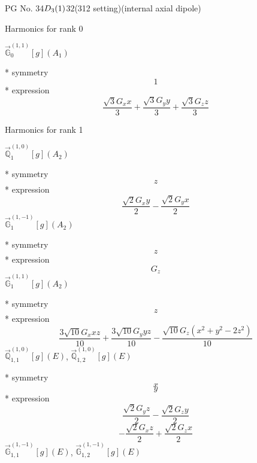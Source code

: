 \documentclass[fleqn,8pt]{jsarticle}
\begin{document}
\setcounter{MaxMatrixCols}{32}

\renewcommand{\tablename}{Table~}
\renewcommand{\figurename}{Figure~}
\begin{center}
\LARGE
PG No. 34\quad$D_{\rm 3}(1)$\quad$32$\quad(312 setting)\quad[ trigonal ] (internal axial dipole)
\end{center}

\noindent * Harmonics for rank 0

\noindent\quad $\vec{\mathbb{G}}_{0}^{(1,1)}[g](A_{1})$

\noindent\quad ** symmetry
\begin{dmath*}
1
\end{dmath*}
\noindent\quad ** expression
\begin{dmath*}
\frac{\sqrt{3} G_{x} x}{3} + \frac{\sqrt{3} G_{y} y}{3} + \frac{\sqrt{3} G_{z} z}{3}
\end{dmath*}

\noindent * Harmonics for rank 1

\noindent\quad $\vec{\mathbb{Q}}_{1}^{(1,0)}[g](A_{2})$

\noindent\quad ** symmetry
\begin{dmath*}
z
\end{dmath*}
\noindent\quad ** expression
\begin{dmath*}
\frac{\sqrt{2} G_{x} y}{2} - \frac{\sqrt{2} G_{y} x}{2}
\end{dmath*}
\noindent\quad $\vec{\mathbb{G}}_{1}^{(1,-1)}[g](A_{2})$

\noindent\quad ** symmetry
\begin{dmath*}
z
\end{dmath*}
\noindent\quad ** expression
\begin{dmath*}
G_{z}
\end{dmath*}
\noindent\quad $\vec{\mathbb{G}}_{1}^{(1,1)}[g](A_{2})$

\noindent\quad ** symmetry
\begin{dmath*}
z
\end{dmath*}
\noindent\quad ** expression
\begin{dmath*}
\frac{3 \sqrt{10} G_{x} x z}{10} + \frac{3 \sqrt{10} G_{y} y z}{10} - \frac{\sqrt{10} G_{z} \left(x^{2} + y^{2} - 2 z^{2}\right)}{10}
\end{dmath*}
\noindent\quad $\vec{\mathbb{Q}}_{1,1}^{(1,0)}[g](E)$, $\vec{\mathbb{Q}}_{1,2}^{(1,0)}[g](E)$

\noindent\quad ** symmetry
\begin{dmath*}
x
\end{dmath*}
\begin{dmath*}
y
\end{dmath*}
\noindent\quad ** expression
\begin{dmath*}
\frac{\sqrt{2} G_{y} z}{2} - \frac{\sqrt{2} G_{z} y}{2}
\end{dmath*}
\begin{dmath*}
- \frac{\sqrt{2} G_{x} z}{2} + \frac{\sqrt{2} G_{z} x}{2}
\end{dmath*}
\noindent\quad $\vec{\mathbb{G}}_{1,1}^{(1,-1)}[g](E)$, $\vec{\mathbb{G}}_{1,2}^{(1,-1)}[g](E)$
\end{document}
